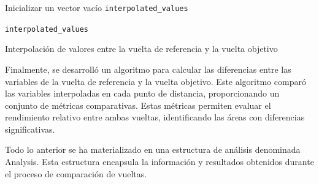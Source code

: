 \IncMargin{1em}
\begin{algorithm}[H]
\LinesNumbered
\SetAlgoLined


Inicializar un vector vacío \texttt{interpolated\_values}\;


\BlankLine
\Return \texttt{interpolated\_values}\;

\caption{Interpolación de valores entre la vuelta de referencia y la vuelta objetivo}
\label{alg:interpolacion}
\end{algorithm}
\DecMargin{1em}


Finalmente, se desarrolló un algoritmo para calcular las diferencias entre las variables de la vuelta de referencia y la vuelta objetivo. Este algoritmo comparó las variables interpoladas en cada punto de distancia, proporcionando un conjunto de métricas comparativas. Estas métricas permiten evaluar el rendimiento relativo entre ambas vueltas, identificando las áreas con diferencias significativas.

Todo lo anterior se ha materializado en una estructura de análisis denominada Analysis. Esta estructura encapsula la información y resultados obtenidos durante el proceso de comparación de vueltas.

